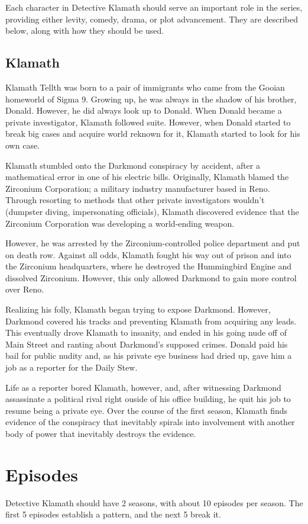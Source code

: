 \documentclass{article}
\begin{document}
Each character in Detective Klamath should serve an important role in the series, providing either levity, comedy, drama, or plot advancement. They are described below, along with how they should be used.

\subsection{Klamath}

Klamath Tellth was born to a pair of immigrants who came from the Gooian homeworld of Sigma 9. Growing up, he was always in the shadow of his brother, Donald. However, he did always look up to Donald. When Donald became a private investigator, Klamath followed suite. However, when Donald started to break big cases and acquire world reknown for it, Klamath started to look for his own case.

Klamath stumbled onto the Darkmond conspiracy by accident, after a mathematical error in one of his electric bills. Originally, Klamath blamed the Zirconium Corporation; a military industry manufacturer based in Reno. Through resorting to methods that other private investigators wouldn't (dumpster diving, impersonating officials), Klamath discovered evidence that the Zirconium Corporation was developing a world-ending weapon.

However, he was arrested by the Zirconium-controlled police department and put on death row. Against all odds, Klamath fought his way out of prison and into the Zirconium headquarters, where he destroyed the Hummingbird Engine and dissolved Zirconium. However, this only allowed Darkmond to gain more control over Reno.

Realizing his folly, Klamath began trying to expose Darkmond. However, Darkmond covered his tracks and preventing Klamath from acquiring any leads. This eventually drove Klamath to insanity, and ended in his going nude off of Main Street and ranting about Darkmond's supposed crimes. Donald paid his bail for public nudity and, as his private eye business had dried up, gave him a job as a reporter for the Daily Stew.

Life as a reporter bored Klamath, however, and, after witnessing Darkmond assassinate a political rival right ouside of his office building, he quit his job to resume being a private eye. Over the course of the first season, Klamath finds evidence of the conspiracy that inevitably spirals into involvement with another body of power that inevitably destroys the evidence.

\section{Episodes}

Detective Klamath should have 2 seasons, with about 10 episodes per season. The first 5 episodes establish a pattern, and the next 5 break it.
\end{document}
